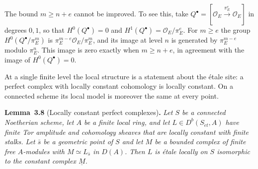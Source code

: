 \documentclass[11pt]{article}
\newenvironment{bpstatement}[2]{\par\addvspace{0.6\baselineskip}\noindent\textbf{#1}#2\textbf{.}\enspace\ignorespaces}
  {\par\addvspace{0.4\baselineskip}}
\newenvironment{bpstatementit}[2]{\begin{bpstatement}{#1}{#2}\itshape\ignorespaces}{\end{bpstatement}}
\begin{document}
\label{bp25}%
The bound \(m\geq n+e\) cannot be improved. To see this, take \(Q^\bullet=[\mathcal O_E\xrightarrow{\pi_E^e}\mathcal O_E]\) in degrees \(0,1\), so that \(H^0(Q^\bullet)=0\) and \(H^1(Q^\bullet)=\mathcal O_E/\pi_E^e\). For \(m\geq e\) the group \(H^0(Q^\bullet/\pi_E^m)\) is \(\pi_E^{m-e}\mathcal O_E/\pi_E^m\), and its image at level \(n\) is generated by \(\pi_E^{m-e}\) modulo \(\pi_E^n\). This image is zero exactly when \(m\geq n+e\), in agreement with the image of \(H^0(Q^\bullet)=0\).

At a single finite level the local structure is a statement about the étale site: a perfect complex with locally constant cohomology is locally constant. On a connected scheme its local model is moreover the same at every point.

\label{bp26}%
\begin{bpstatementit}{Lemma~3.8}{ (Locally constant perfect complexes)}
Let \(S\) be a connected Noetherian scheme, let \(A\) be a finite local ring, and let \(L\in D^b(S_{\acute{e}t},A)\) have finite Tor amplitude and cohomology sheaves that are locally constant with finite stalks. Let \(\bar s\) be a geometric point of \(S\) and let \(M\) be a bounded complex of finite free \(A\)-modules with \(M\simeq L_{\bar s}\) in \(D(A)\). Then \(L\) is étale locally on \(S\) isomorphic to the constant complex \(\underline M\).
\end{bpstatementit}
\end{document}

